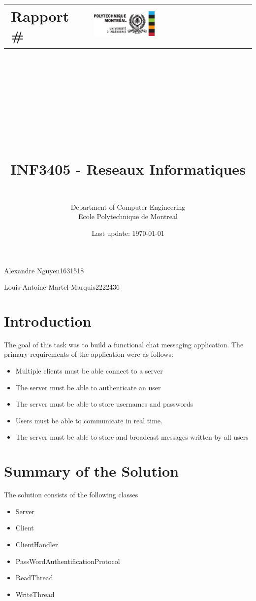 \documentclass[11pt,letterpaper]{article}
\title{\vspace{-2.5cm} \noindent\makebox[\linewidth]{\color{rouge_poly}{\rule{\textwidth}{1.5pt}}}
		\begin{center}
		\begin{tabular}{m{6.5cm}m{6cm}}
		\textbf{ \huge Rapport \#\reportnumber}  & \includegraphics[width=0.4\textwidth]{logo_polytechnique.eps}
		\end{tabular}
		\end{center}
		\vspace{-0.25cm}
		\noindent\makebox[\linewidth]{\color{rouge_poly}{\rule{\textwidth}{1.5pt}}}
		\\ \  \\
		\Huge \firsttitle \\ \secondtitle  
		\\ \ \\
		\LARGE INF3405 -  Reseaux Informatiques
		}
\author{\session \\ Department of Computer Engineering \\ Ecole Polytechnique de Montreal}
\date{Last update: \today}
\newcommand{\firstauthor}{Alexandre Nguyen}
\newcommand{\firstregistrationnumber}{1631518}
\newcommand{\secondauthor}{Louis-Antoine Martel-Marquis}
\newcommand{\secondregistrationnumber}{2222436}
\begin{document}
\maketitle
\noindent\makebox[\linewidth]{\color{rouge_poly}{\rule{\textwidth}{1.5pt}}} 

\noindent \LARGE \firstauthor  \hfill \firstregistrationnumber

\noindent \LARGE \secondauthor \hfill \secondregistrationnumber

\noindent\makebox[\linewidth]{\color{rouge_poly}{\rule{\textwidth}{1.5pt}}}


\newpage
\normalsize

\section{Introduction}

The goal of this task was to build  a functional chat messaging application. The primary requirements of the application were as follows:
\begin{itemize}
  \item Multiple clients must be able connect to a server
  \item The server must be able to authenticate an user
  \item The server must be able to store usernames and passwords
  \item Users must be able to communicate in real time.
   \item The server must be able to store and broadcast messages written by all users
\end{itemize}

\section{Summary of the Solution}
The solution consists of the following classes
\begin{itemize}
  \item Server
  \item Client
  \item ClientHandler
   \item PassWordAuthentificationProtocol
   \item ReadThread
   \item WriteThread
\end{itemize}
\end{document}
